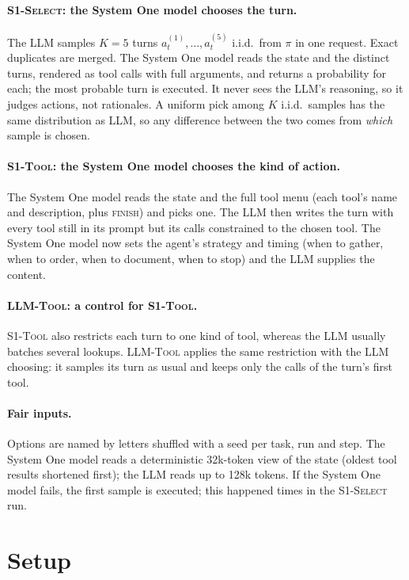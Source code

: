 \documentclass[11pt]{article}
\newcommand{\llm}{\textsc{LLM}}
\newcommand{\sel}{\textsc{S1-Select}}
\newcommand{\tool}{\textsc{S1-Tool}}
\newcommand{\ctl}{\textsc{LLM-Tool}}
\begin{document}
\paragraph{\sel{}: the System One model chooses the turn.} The LLM samples $K{=}5$ turns $a_t^{(1)},\dots,a_t^{(5)}$
i.i.d.\ from $\pi$ in one request. Exact duplicates are merged. The System One model reads the state and the distinct
turns, rendered as tool calls with full arguments, and returns a probability for each; the most probable turn is
executed. It never sees the LLM's reasoning, so it judges actions, not rationales. A uniform pick among $K$ i.i.d.\
samples has the same distribution as \llm, so any difference between the two comes from \emph{which} sample is chosen.

\paragraph{\tool{}: the System One model chooses the kind of action.} The System One model reads the state and the
full tool menu (each tool's name and description, plus \textsc{finish}) and picks one. The LLM then writes the turn
with every tool still in its prompt but its calls constrained to the chosen tool. The System One model now sets the
agent's strategy and timing (when to gather, when to order, when to document, when to stop) and the LLM supplies the
content.

\paragraph{\ctl{}: a control for \tool.} \tool{} also restricts each turn to one kind of tool, whereas the LLM usually
batches several lookups. \ctl{} applies the same restriction with the LLM choosing: it samples its turn as usual and
keeps only the calls of the turn's first tool.

\paragraph{Fair inputs.} Options are named by letters shuffled with a seed per task, run and step. The System One model
reads a deterministic 32k-token view of the state (oldest tool results shortened first); the LLM reads up to 128k
tokens. If the System One model fails, the first sample is executed; this happened \DECSelerr{} times in the
\sel{} run.

\section{Setup}\label{sec:setup}
\end{document}
